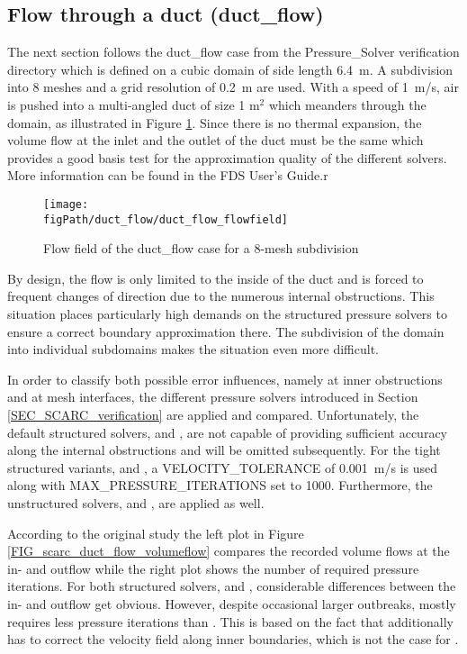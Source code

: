\subsection{Flow through a duct ({\ct duct\_flow})}
\label{SEC_SCARC_duct_flow}

The next section follows the {\ct duct\_flow} case from the Pressure\_Solver verification directory which is defined on a cubic domain of side length 6.4~m. A subdivision into 8 meshes and a grid resolution of 0.2~m are used. 
With a speed of 1~m/s, air is pushed into a multi-angled duct of size 1 m$^2$ which meanders through the domain, as
illustrated in Figure \ref{FIG_scarc_duct_flow_flowfield}. 
Since there is no thermal expansion, the volume flow at the inlet and the outlet of the duct must be the same which provides a good basis test for the approximation quality of the different solvers. More information can be found in the FDS User's Guide\cite{McGrattan:2018:UG}.r


\begin{figure}[ht]
\centering\texttt{[image: \\figPath/duct\_flow/duct\_flow\_flowfield]}
\caption{Flow field of the {\ct duct\_flow} case for a 8-mesh subdivision}
\label{FIG_scarc_duct_flow_flowfield}
\end{figure}

\newpage
By design, the flow is only limited to the inside of the duct and is forced to frequent changes of direction due to the numerous internal obstructions. This situation places particularly high demands on the structured pressure solvers to ensure a correct boundary approximation there. The subdivision of the domain into individual subdomains makes the situation even more difficult.

In order to classify both possible error influences, namely at inner obstructions and at mesh interfaces, the different pressure solvers introduced in Section \ref{SEC_SCARC_verification} are applied and compared. Unfortunately, the default structured solvers, \fftdefault{} and \scarcdefault{}, are not capable of providing sufficient accuracy along the internal obstructions and will be omitted subsequently. For the tight structured variants, \ffttight{} and \scarctight{}, a {\ct VELOCITY\_TOLERANCE} of 0.001~m/s is used along with {\ct MAX\_PRESSURE\_ITERATIONS} set to 1000. Furthermore, the unstructured solvers, \uglmat{} and \uscarc{},  are applied as well.
 
According to the original study the left plot in Figure \ref{FIG_scarc_duct_flow_volumeflow} compares the recorded volume flows at the in- and outflow while the right plot shows the number of required pressure iterations.
For both structured solvers, \ffttight{} and \scarctight{}, considerable differences between the in- and outflow get obvious. However, despite occasional larger outbreaks, \scarctight{} mostly requires less pressure iterations than \ffttight{}. This is based on the fact that \ffttight{} additionally has to correct the velocity field along inner boundaries, which is not the case for \scarctight{}. 

